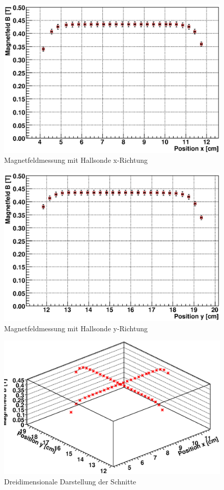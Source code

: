 \documentclass[12pt]{article}
\begin{document}
\begin{figure}[H]
\centering
\includegraphics[width=0.9\linewidth]{pictures/hallsonde_x.eps}
\caption{Magnetfeldmessung mit Hallsonde x-Richtung}
\label{hallx}
\end{figure}

\begin{figure}[H]
\centering
\includegraphics[width=0.9\linewidth]{pictures/hallsonde_y.eps}
\caption{Magnetfeldmessung mit Hallsonde y-Richtung}
\label{hally}
\end{figure}

\begin{figure}[H]
\centering
\includegraphics[width=0.9\linewidth]{pictures/hallxy.eps}
\caption{Dreidimensionale Darstellung der Schnitte}
\label{hallxy}
\end{figure}
\end{document}
